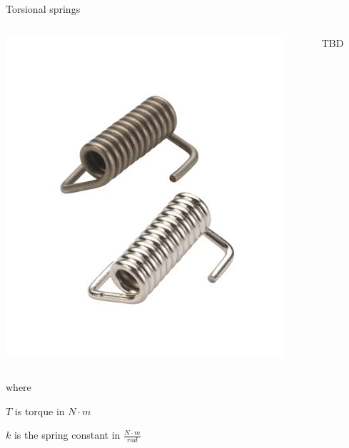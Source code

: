 \documentclass[compress]{beamer}
\begin{document}
\begin{frame}{Torsional springs}

    \begin{columns}
        \begin{column}{0.5\linewidth}
            \begin{center}
                \includegraphics[height=0.3\paperheight]{image54}
            \end{center}
        \end{column}
        \begin{column}{0.5\linewidth}
            TBD
        \end{column}
    \end{columns}
where

$T$ is torque in $N\cdot m$

$k$ is the spring constant in $\frac{N\cdot m}{rad}$

\end{frame}
\end{document}
